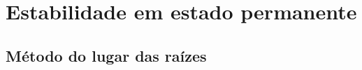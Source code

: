 \section{Estabilidade em estado permanente}

\lipsum[1]

\subsection{Método do lugar das raízes}
\lipsum[1]


\pagebreak

